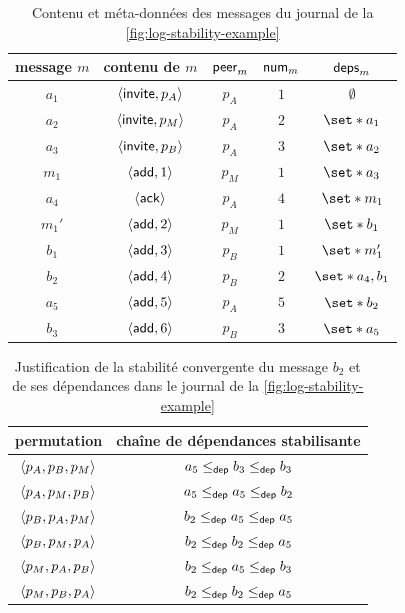 \begin{table}[ht]
    \centering
    \begin{tabular}{ccccc}
        message $m$ & contenu de $m$ & $\trm{peer}_m$ & $\trm{num}_m$ & $\trm{deps}_m$ \\
        \toprule
        $a_1$ & $\tuple*{\trm{invite}, p_A}$ & $p_A$ & $1$ & $\emptyset$ \\
        $a_2$ & $\tuple*{\trm{invite}, p_M}$ & $p_A$ & $2$ & $\set*{a_1}$ \\
        $a_3$ & $\tuple*{\trm{invite}, p_B}$ & $p_A$ & $3$ & $\set*{a_2}$ \\
        $m_1$ & $\tuple*{\trm{add}, 1}$ & $p_M$ & $1$ & $\set*{a_3}$ \\
        $a_4$ & $\tuple*{\trm{ack}}$ & $p_A$ & $4$ & $\set*{m_1}$ \\
        $m_1'$ & $\tuple*{\trm{add}, 2}$ & $p_M$ & $1$ & $\set*{b_1}$ \\
        $b_1$ & $\tuple*{\trm{add}, 3}$ & $p_B$ & $1$ & $\set*{m_1'}$ \\
        $b_2$ & $\tuple*{\trm{add}, 4}$ & $p_B$ & $2$ & $\set*{a_4,b_1}$ \\
        $a_5$ & $\tuple*{\trm{add}, 5}$ & $p_A$ & $5$ & $\set*{b_2}$ \\
        $b_3$ & $\tuple*{\trm{add}, 6}$ & $p_B$ & $3$ & $\set*{a_5}$ \\
    \end{tabular}
    \caption{Contenu et méta-données des messages du journal de la \autoref{fig:log-stability-example}}\label{tab:log-stability-example-metadata}
\end{table}

\begin{table}[ht]
    \centering
    \begin{tabular}{cc}
        permutation & chaîne de dépendances stabilisante \\
        \toprule
        $\tuple*{p_A, p_B, p_M}$ & $a_5 \depeq b_3 \depeq b_3$ \\
        $\tuple*{p_A, p_M, p_B}$ & $a_5 \depeq a_5 \depeq b_2$ \\
        $\tuple*{p_B, p_A, p_M}$ & $b_2 \depeq a_5 \depeq a_5$ \\
        $\tuple*{p_B, p_M, p_A}$ & $b_2 \depeq b_2 \depeq a_5$ \\
        $\tuple*{p_M, p_A, p_B}$ & $b_2 \depeq a_5 \depeq b_3$ \\
        $\tuple*{p_M, p_B, p_A}$ & $b_2 \depeq b_2 \depeq a_5$ \\
    \end{tabular}
    \caption[Justification de la stabilité convergente des messages de la \autoref{fig:log-stability-example}]{Justification de la stabilité convergente du message $b_2$ et de ses dépendances dans le journal de la \autoref{fig:log-stability-example}}\label{tab:log-stability-example}
\end{table}

